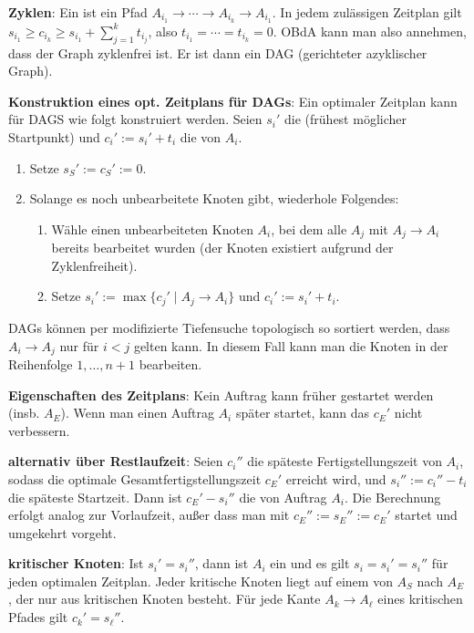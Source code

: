 \textbf{Zyklen}:
Ein  ist ein Pfad $A_{i_1} \to \dotsb \to A_{i_k} \to A_{i_1}$.
In jedem zulässigen Zeitplan gilt $s_{i_1} \ge c_{i_k} \ge s_{i_1} + \sum_{j=1}^k t_{i_j}$,
also $t_{i_1} = \dotsb = t_{i_k} = 0$.
OBdA kann man also annehmen, dass der Graph zyklenfrei ist.
Er ist dann ein DAG (gerichteter azyklischer Graph).

\linie
\pagebreak

\textbf{Konstruktion eines opt. Zeitplans für DAGs}:
Ein optimaler Zeitplan kann für DAGS wie folgt konstruiert werden.
Seien $s_i'$ die  (frühest möglicher Startpunkt) und
$c_i' := s_i' + t_i$ die  von $A_i$.
\begin{enumerate}
    \item
    Setze $s_S' := c_S' := 0$.
    
    \item
    Solange es noch unbearbeitete Knoten gibt, wiederhole Folgendes:
    \begin{enumerate}
        \item
        Wähle einen unbearbeiteten Knoten $A_i$, bei dem alle $A_j$ mit $A_j \to A_i$
        bereits bearbeitet wurden
        (der Knoten existiert aufgrund der Zyklenfreiheit).
        
        \item
        Setze $s_i' := \max\{c_j' \;|\; A_j \to A_i\}$ und $c_i' := s_i' + t_i$.
    \end{enumerate}
\end{enumerate}
DAGs können per modifizierte Tiefensuche topologisch so sortiert werden, dass
$A_i \to A_j$ nur für $i < j$ gelten kann.
In diesem Fall kann man die Knoten in der Reihenfolge $1, \dotsc, n + 1$ bearbeiten.

\textbf{Eigenschaften des Zeitplans}:
Kein Auftrag kann früher gestartet werden (insb. $A_E$).
Wenn man einen Auftrag $A_i$ später startet, kann das $c_E'$ nicht verbessern.

\textbf{alternativ über Restlaufzeit}:
Seien $c_i''$ die späteste Fertigstellungszeit von $A_i$, sodass die optimale
Gesamtfertigstellungszeit $c_E'$ erreicht wird, und $s_i'' := c_i'' - t_i$ die späteste
Startzeit.
Dann ist $c_E' - s_i''$ die  von Auftrag $A_i$.
Die Berechnung erfolgt analog zur Vorlaufzeit, außer dass man mit
$c_E'' := s_E'' := c_E'$ startet und umgekehrt vorgeht.

\linie

\textbf{kritischer Knoten}:
Ist $s_i' = s_i''$, dann ist $A_i$ ein 
und es gilt $s_i = s_i' = s_i''$ für jeden optimalen Zeitplan.
Jeder kritische Knoten liegt auf einem  von $A_S$ nach $A_E$, der nur aus
kritischen Knoten besteht.
Für jede Kante $A_k \to A_\ell$ eines kritischen Pfades gilt $c_k' = s_\ell''$.

